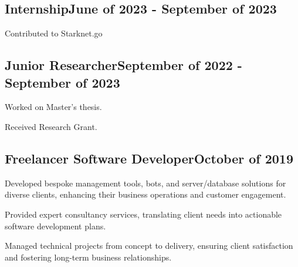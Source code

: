 \documentclass[a4paper,12pt]{article}
\begin{document}

\vspace*{6pt}
\subsection{{Internship}\hfill June of 2023 - September of 2023}
\begin{zitemize}
    \item Contributed to Starknet.go
\end{zitemize}



\vspace*{6pt}
\subsection{{Junior Researcher}\hfill September of 2022 - September of 2023}
\begin{zitemize}
    \item Worked on Master's thesis.
    \item Received Research Grant.
\end{zitemize}

\vspace*{6pt}
\subsection{{Freelancer Software Developer}\hfill October of 2019}
\begin{zitemize}
\item Developed bespoke management tools, bots, and server/database solutions for diverse clients, enhancing their business operations and customer engagement.
\item Provided expert consultancy services, translating client needs into actionable software development plans.
\item Managed technical projects from concept to delivery, ensuring client satisfaction and fostering long-term business relationships.
\end{zitemize}
\end{document}
